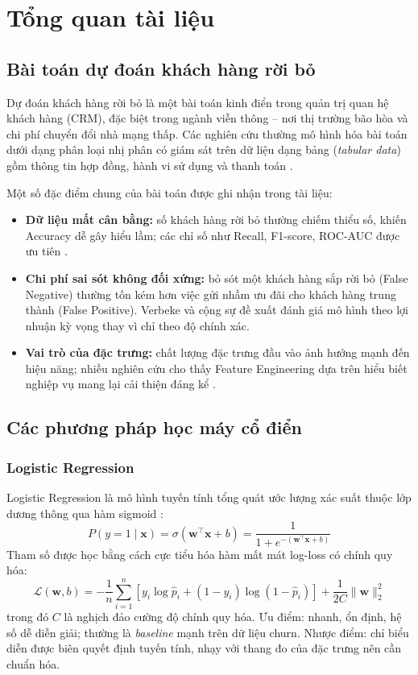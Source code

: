 \section{Tổng quan tài liệu}

\subsection{Bài toán dự đoán khách hàng rời bỏ}
Dự đoán khách hàng rời bỏ là một bài toán kinh điển trong quản trị quan hệ khách hàng (CRM), đặc biệt trong ngành viễn thông -- nơi thị trường bão hòa và chi phí chuyển đổi nhà mạng thấp. Các nghiên cứu thường mô hình hóa bài toán dưới dạng phân loại nhị phân có giám sát trên dữ liệu dạng bảng (\textit{tabular data}) gồm thông tin hợp đồng, hành vi sử dụng và thanh toán \cite{huang2012, verbeke2012}.

Một số đặc điểm chung của bài toán được ghi nhận trong tài liệu:
\begin{itemize}
    \item \textbf{Dữ liệu mất cân bằng:} số khách hàng rời bỏ thường chiếm thiểu số, khiến Accuracy dễ gây hiểu lầm; các chỉ số như Recall, F1-score, ROC-AUC được ưu tiên \cite{vafeiadis2015}.
    \item \textbf{Chi phí sai sót không đối xứng:} bỏ sót một khách hàng sắp rời bỏ (False Negative) thường tốn kém hơn việc gửi nhầm ưu đãi cho khách hàng trung thành (False Positive). Verbeke và cộng sự \cite{verbeke2012} đề xuất đánh giá mô hình theo lợi nhuận kỳ vọng thay vì chỉ theo độ chính xác.
    \item \textbf{Vai trò của đặc trưng:} chất lượng đặc trưng đầu vào ảnh hưởng mạnh đến hiệu năng; nhiều nghiên cứu cho thấy Feature Engineering dựa trên hiểu biết nghiệp vụ mang lại cải thiện đáng kể \cite{huang2012, ahmad2019}.
\end{itemize}

\subsection{Các phương pháp học máy cổ điển}

\subsubsection{Logistic Regression}
Logistic Regression là mô hình tuyến tính tổng quát ước lượng xác suất thuộc lớp dương thông qua hàm sigmoid \cite{hosmer2013}:
\begin{equation}
    P(y = 1 \mid \mathbf{x}) = \sigma(\mathbf{w}^\top \mathbf{x} + b) = \frac{1}{1 + e^{-(\mathbf{w}^\top \mathbf{x} + b)}}
\end{equation}
Tham số được học bằng cách cực tiểu hóa hàm mất mát log-loss có chính quy hóa:
\begin{equation}
    \mathcal{L}(\mathbf{w}, b) = -\frac{1}{n}\sum_{i=1}^{n}\left[y_i \log \hat{p}_i + (1-y_i)\log(1-\hat{p}_i)\right] + \frac{1}{2C}\|\mathbf{w}\|_2^2
\end{equation}
trong đó $C$ là nghịch đảo cường độ chính quy hóa. Ưu điểm: nhanh, ổn định, hệ số dễ diễn giải; thường là \textit{baseline} mạnh trên dữ liệu churn. Nhược điểm: chỉ biểu diễn được biên quyết định tuyến tính, nhạy với thang đo của đặc trưng nên cần chuẩn hóa.

